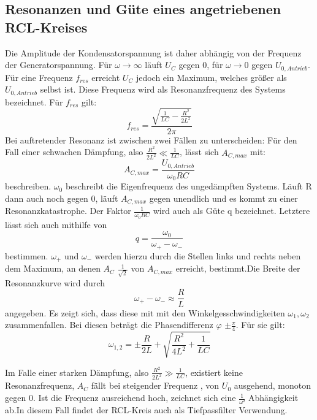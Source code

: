 \subsection{Resonanzen und Güte eines angetriebenen RCL-Kreises}
Die Amplitude der Kondensatorspannung ist daher abhängig von der Frequenz der Generatorspannung.
Für $\omega \to \infty$ läuft $U_C$ gegen 0, für $\omega \to 0$ gegen $U_{0,Antrieb}$.
Für eine Frequenz $f_{res}$ erreicht $U_C$  jedoch ein Maximum, welches größer als $U_{0,Antrieb}$ selbst ist.
Diese Frequenz wird als Resonanzfrequenz des Systems bezeichnet. Für $f_{res}$ gilt:
\begin{equation}
  f_{res} = \frac{\sqrt{\frac{1}{LC}-\frac{R^2}{2L^2}}}{2 \pi}
\end{equation}
Bei auftretender Resonanz ist zwischen zwei Fällen zu unterscheiden:
Für den Fall einer schwachen Dämpfung, also $\frac{R^2}{2L^2} \ll \frac{1}{LC}$, lässt sich $A_{C,max}$ mit:
\begin{equation}
  A_{C,max} = \frac{U_{0,Antrieb}}{\omega_0 RC}
\end{equation}
beschreiben. $\omega_0$ beschreibt die Eigenfrequenz des ungedämpften Systems.
Läuft R dann auch noch gegen 0, läuft $A_{C,max}$ gegen unendlich und es kommt zu einer
Resonanzkatastrophe.
 Der Faktor $\frac{1}{\omega_0 RC}$ wird auch als Güte q bezeichnet.
Letztere lässt sich auch mithilfe von
\begin{equation}
  q = \frac{\omega_0}{\omega_+ - \omega_-}
  \end{equation}
bestimmen. $\omega_+$ und $\omega_-$ werden  hierzu durch die Stellen links und rechts neben dem Maximum,
 an denen $A_C$ $\frac{1}{\sqrt{2}}$ von $A_{C,max}$ erreicht, bestimmt.Die Breite der Resonanzkurve wird durch
 \begin{equation}
   \omega_+ - \omega_- \approx \frac{R}{L}
 \end{equation}
 angegeben. Es zeigt sich, dass diese mit mit den Winkelgesschwindigkeiten $\omega_1,\omega_2$ zusammenfallen.
  Bei diesen beträgt die Phasendifferenz $\varphi$ $\pm \frac{\pi}{4}$. Für sie gilt:
\begin{equation}
  \omega_{1,2} = \pm \frac{R}{2L} + \sqrt{\frac{R^2}{4L^2} + \frac{1}{LC}}
\end{equation}


 Im Falle einer starken Dämpfung, also $\frac{R^2}{2L^2} \gg \frac{1}{LC}$, existiert keine Resonanzfrequenz, $A_C$ fällt bei steigender Frequenz
 , von $U_0$ ausgehend, monoton gegen 0. Ist die Frequenz ausreichend hoch, zeichnet
  sich eine $\frac{1}{\omega²}$ Abhängigkeit ab.In diesem Fall findet der RCL-Kreis auch als Tiefpassfilter Verwendung.
